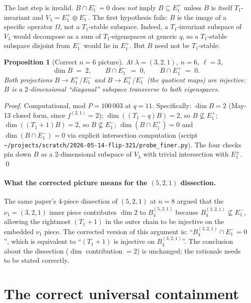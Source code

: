 \documentclass[11pt]{article}
\newtheorem{proposition}[theorem]{Proposition}
\theoremstyle{definition}
\newcommand{\Vlam}{V_\lambda}
\newcommand{\Om}{\Omega}
\begin{document}
The last step is invalid.  $B \cap E_1^- = 0$ does \emph{not} imply
$B \subseteq E_1^+$ unless $B$ is itself $T_1$-invariant and $\Vlam
= E_1^+ \oplus E_1^-$.  The first hypothesis fails: $B$ is the
image of a specific operator $\Om$, not a $T_1$-stable subspace.
Indeed, a $T_1$-invariant subspace of $\Vlam$ would decompose as a
sum of $T_1$-eigenspaces at generic $q$, so a $T_1$-stable subspace
disjoint from $E_1^-$ would lie in $E_1^+$.  But $B$ need not be
$T_1$-stable.

\begin{proposition}[Correct $n = 6$ picture]\label{prop:correct-n6}
At $\lambda = (3, 2, 1)$, $n = 6$, $\ell = 3$,
\[
   \dim B \;=\; 2,
   \qquad B \cap E_1^- \;=\; 0,
   \qquad B \cap E_1^+ \;=\; 0.
\]
Both projections $B \to E_1^+/\!E_1^-$ and $B \to E_1^+ / E_1^-$ (the
quotient maps) are injective: $B$ is a $2$-dimensional ``diagonal''
subspace transverse to both eigenspaces.
\end{proposition}

\begin{proof}
Computational, mod $P = 100\,003$ at $q = 11$.  Specifically:
$\dim B = 2$ (May-13 closed form, since $f^{(2, 1)} = 2$);
$\dim((T_1 - q) B) = 2$, so $B \not\subseteq E_1^+$;
$\dim((T_1 + 1) B) = 2$, so $B \not\subseteq E_1^-$;
$\dim(B \cap E_1^+) = 0$ and $\dim(B \cap E_1^-) = 0$ via explicit
intersection computation (script
\texttt{\textasciitilde/projects/scratch/2026-05-14-flip-321/probe\_finer.py}).
The four checks pin down $B$ as a 2-dimensional subspace of
$\Vlam$ with trivial intersection with $E_1^\pm$.  \qed
\end{proof}

\paragraph{What the corrected picture means for the $(5, 2, 1)$
dissection.}  The same paper's 4-piece dissection of $(5, 2, 1)$ at
$n = 8$ argued that the $\nu_1 = (3, 2, 1)$ inner piece contributes
$\dim 2$ to $B^{(5, 2, 1)}_4$ because $B^{(3, 2, 1)}_4 \not\subseteq
E_1^-$, allowing the rightmost $(T_1{+}1)$ in the outer chain to be
injective on the embedded $\nu_1$ piece.  The corrected version of
this argument is: ``$B^{(3, 2, 1)}_4 \cap E_1^- = 0$'', which is
equivalent to ``$(T_1{+}1)$ is injective on $B^{(3, 2, 1)}_4$''.
The conclusion about the dissection ($\dim$ contribution $= 2$) is
unchanged; the rationale needs to be stated correctly.

\section{The correct universal containment}\label{sec:universal}
\end{document}
